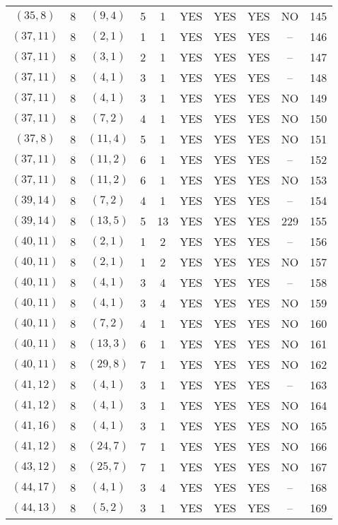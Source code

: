 \begin{longtable}{|c|c|c|c|c|c|c|c|c|c|}
$(35, 8)$ & 8 & $(9, 4)$ & 5 & 1 & YES & YES & YES & NO & 145\\
$(37, 11)$ & 8 & $(2, 1)$ & 1 & 1 & YES & YES & YES & -- & 146\\
$(37, 11)$ & 8 & $(3, 1)$ & 2 & 1 & YES & YES & YES & -- & 147\\
$(37, 11)$ & 8 & $(4, 1)$ & 3 & 1 & YES & YES & YES & -- & 148\\
$(37, 11)$ & 8 & $(4, 1)$ & 3 & 1 & YES & YES & YES & NO & 149\\
$(37, 11)$ & 8 & $(7, 2)$ & 4 & 1 & YES & YES & YES & NO & 150\\
$(37, 8)$ & 8 & $(11, 4)$ & 5 & 1 & YES & YES & YES & NO & 151\\
$(37, 11)$ & 8 & $(11, 2)$ & 6 & 1 & YES & YES & YES & -- & 152\\
$(37, 11)$ & 8 & $(11, 2)$ & 6 & 1 & YES & YES & YES & NO & 153\\
$(39, 14)$ & 8 & $(7, 2)$ & 4 & 1 & YES & YES & YES & -- & 154\\
$(39, 14)$ & 8 & $(13, 5)$ & 5 & 13 & YES & YES & YES & 229 & 155\\
$(40, 11)$ & 8 & $(2, 1)$ & 1 & 2 & YES & YES & YES & -- & 156\\
$(40, 11)$ & 8 & $(2, 1)$ & 1 & 2 & YES & YES & YES & NO & 157\\
$(40, 11)$ & 8 & $(4, 1)$ & 3 & 4 & YES & YES & YES & -- & 158\\
$(40, 11)$ & 8 & $(4, 1)$ & 3 & 4 & YES & YES & YES & NO & 159\\
$(40, 11)$ & 8 & $(7, 2)$ & 4 & 1 & YES & YES & YES & NO & 160\\
$(40, 11)$ & 8 & $(13, 3)$ & 6 & 1 & YES & YES & YES & NO & 161\\
$(40, 11)$ & 8 & $(29, 8)$ & 7 & 1 & YES & YES & YES & NO & 162\\
$(41, 12)$ & 8 & $(4, 1)$ & 3 & 1 & YES & YES & YES & -- & 163\\
$(41, 12)$ & 8 & $(4, 1)$ & 3 & 1 & YES & YES & YES & NO & 164\\
$(41, 16)$ & 8 & $(4, 1)$ & 3 & 1 & YES & YES & YES & NO & 165\\
$(41, 12)$ & 8 & $(24, 7)$ & 7 & 1 & YES & YES & YES & NO & 166\\
$(43, 12)$ & 8 & $(25, 7)$ & 7 & 1 & YES & YES & YES & NO & 167\\
$(44, 17)$ & 8 & $(4, 1)$ & 3 & 4 & YES & YES & YES & -- & 168\\
$(44, 13)$ & 8 & $(5, 2)$ & 3 & 1 & YES & YES & YES & -- & 169\\

\end{longtable}
